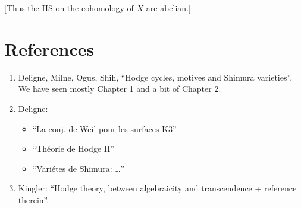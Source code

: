 [Thus the HS on the cohomology of $X$ are
abelian.]








\section{References}
\label{section-references}

\begin{enumerate}
\item Deligne, Milne, Ogus, Shih,
``Hodge cycles, motives and Shimura
varieties''.
We have seen mostly Chapter 1 and a bit of
Chapter 2.

\item Deligne:
\begin{itemize}
\item
``La conj. de Weil pour les surfaces K3''

\item ``Théorie de Hodge II''

\item ``Variétes de Shimura: …''
\end{itemize}

\item Kingler: ``Hodge theory, between
algebraicity and transcendence
+ reference therein''.
\end{enumerate}



